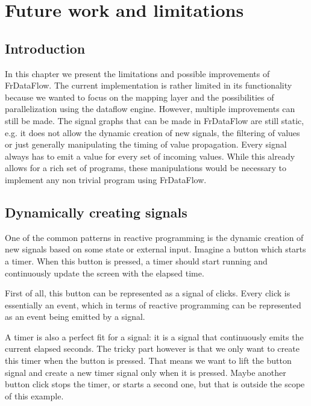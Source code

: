 \chapter{Future work and limitations}

\section{Introduction}

In this chapter we present the limitations and possible improvements of FrDataFlow. 
The current implementation is rather limited in its functionality because we wanted to focus on the mapping layer and the possibilities of parallelization using the dataflow engine.
However, multiple improvements can still be made. The signal graphs that can be made in FrDataFlow are still static, e.g. it does not allow the dynamic creation of new signals, the filtering of values or just generally manipulating the timing of value propagation. Every signal always has to emit a value for every set of incoming values. While this already allows for a rich set of programs, these manipulations would be necessary to implement any non trivial program using FrDataFlow. 

\newpage
\section{Dynamically creating signals}

One of the common patterns in reactive programming is the dynamic creation of new signals based on some state or external input. Imagine a button which starts a timer. When this button is pressed, a timer should start running and continuously update the screen with the elapsed time.

First of all, this button can be represented as a signal of clicks. Every click is essentially an event, which in terms of reactive programming can be represented as an event being emitted by a signal.

A timer is also a perfect fit for a signal: it is a signal that continuously emits the current elapsed seconds. The tricky part however is that we only want to create this timer when the button is pressed. That means we want to lift the button signal and create a new timer signal only when it is pressed. Maybe another button click stops the timer, or starts a second one, but that is outside the scope of this example.

